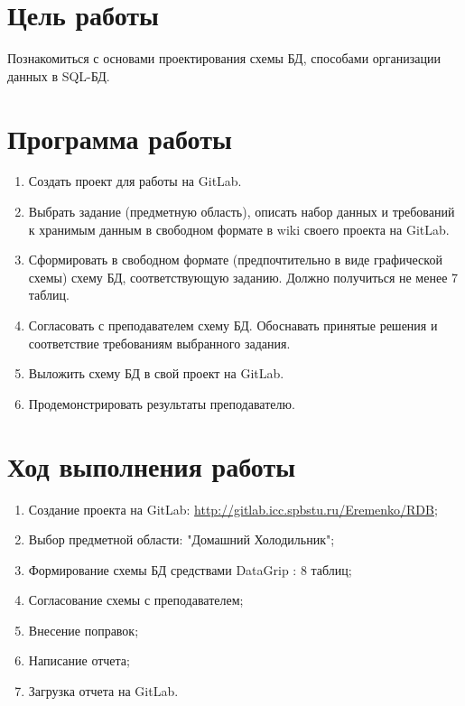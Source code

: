 


\def\subjectName{Базы данных}
\def\titleName{Разработка структуры БД}
\def\workNumber{1}
\def\studentName{Еременко Д.Ю.}
\def\groupNumber{33531/2}
\def\teacherName{Мяснов А.В.}


\renewcommand\contentsname{\centerline{Содержание}}
\tableofcontents
\newpage


\section{Цель работы}
Познакомиться с основами проектирования схемы БД, способами организации данных в SQL-БД.

\section{Программа работы}

\begin{enumerate}
\item Создать проект для работы на GitLab.
\item Выбрать задание (предметную область), описать набор данных и требований к хранимым данным в свободном формате в wiki своего проекта на GitLab.
\item Сформировать в свободном формате (предпочтительно в виде графической схемы) схему БД, соответствующую заданию. Должно получиться не менее 7 таблиц.
\item Согласовать с преподавателем схему БД. Обоснавать принятые решения и соответствие требованиям выбранного задания.
\item Выложить схему БД в свой проект на GitLab.
\item Продемонстрировать результаты преподавателю.
\end{enumerate}

\section{Ход выполнения работы}

\begin{enumerate}
\item Создание проекта на GitLab: \url{http://gitlab.icc.spbstu.ru/Eremenko/RDB};
\item Выбор предметной области: "Домашний Холодильник";
\item Формирование схемы БД средствами DataGrip : 8 таблиц;
\item Согласование схемы с преподавателем;
\item Внесение поправок;
\item Написание отчета;
\item Загрузка отчета на GitLab.
\end{enumerate}

